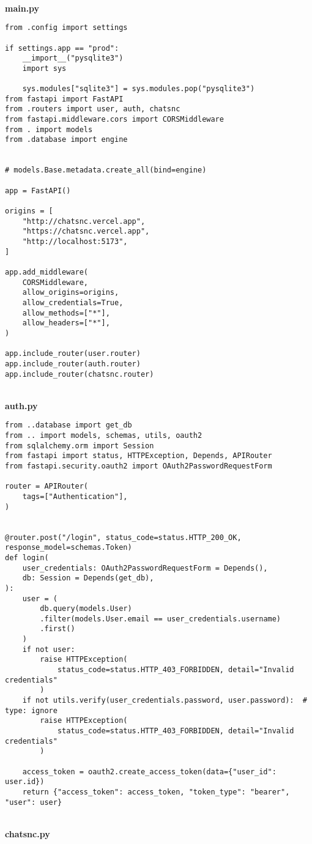 \
\\
\textbf{main.py}

\begin{Verbatim}[breaklines=true, breakanywhere=true]
from .config import settings

if settings.app == "prod":
    __import__("pysqlite3")
    import sys

    sys.modules["sqlite3"] = sys.modules.pop("pysqlite3")
from fastapi import FastAPI
from .routers import user, auth, chatsnc
from fastapi.middleware.cors import CORSMiddleware
from . import models
from .database import engine


# models.Base.metadata.create_all(bind=engine)

app = FastAPI()

origins = [
    "http://chatsnc.vercel.app",
    "https://chatsnc.vercel.app",
    "http://localhost:5173",
]

app.add_middleware(
    CORSMiddleware,
    allow_origins=origins,
    allow_credentials=True,
    allow_methods=["*"],
    allow_headers=["*"],
)

app.include_router(user.router)
app.include_router(auth.router)
app.include_router(chatsnc.router)
\end{Verbatim}

\
\\
\textbf{auth.py}

\begin{Verbatim}[breaklines=true, breakanywhere=true]
from ..database import get_db
from .. import models, schemas, utils, oauth2
from sqlalchemy.orm import Session
from fastapi import status, HTTPException, Depends, APIRouter
from fastapi.security.oauth2 import OAuth2PasswordRequestForm

router = APIRouter(
    tags=["Authentication"],
)

 
@router.post("/login", status_code=status.HTTP_200_OK, response_model=schemas.Token)
def login(
    user_credentials: OAuth2PasswordRequestForm = Depends(),
    db: Session = Depends(get_db),
):
    user = (
        db.query(models.User)
        .filter(models.User.email == user_credentials.username)
        .first()
    )
    if not user:
        raise HTTPException(
            status_code=status.HTTP_403_FORBIDDEN, detail="Invalid credentials"
        )
    if not utils.verify(user_credentials.password, user.password):  # type: ignore
        raise HTTPException(
            status_code=status.HTTP_403_FORBIDDEN, detail="Invalid credentials"
        )

    access_token = oauth2.create_access_token(data={"user_id": user.id})
    return {"access_token": access_token, "token_type": "bearer", "user": user}

\end{Verbatim}
\
\\
\textbf{chatsnc.py}

